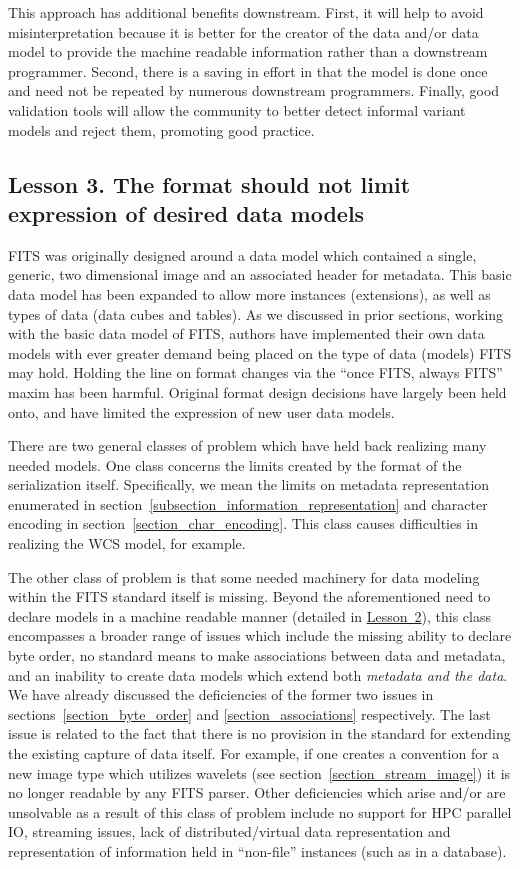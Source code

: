 \documentclass[final,authoryear,5p,times,twocolumn]{elsarticle}
\begin{document}
{{This approach has additional benefits downstream. First, it will help 
to avoid misinterpretation because it is better for the creator
of the data and/or data model to provide the machine readable information rather
than a downstream programmer. Second, there is a saving in effort
in that the model is done once and need not be repeated by numerous
downstream programmers. Finally, good validation tools will allow the community
to better detect informal variant models and reject them, promoting good
practice.


\subsection{Lesson 3. The format should not limit expression of desired data models}

FITS was originally designed around a data model which contained a single, generic, 
two dimensional image and an associated header for metadata. This basic data model
has been expanded to allow more instances (extensions), as well as types of data 
(data cubes and tables). 
As we discussed in prior sections, working with the basic data model of FITS,
authors have implemented their own data models with ever greater demand being
placed on the type of data (models) FITS may hold.
Holding the line on format changes via the ``once FITS, always FITS'' maxim 
has been harmful.  Original format design decisions have largely been held onto, 
and have limited the expression of new user data models. 


There are two general classes of problem which have held back realizing
many needed models. One class concerns the limits created by the format
of the serialization itself. Specifically, we mean the limits on metadata 
representation enumerated in section~\ref{subsection_information_representation}
and character encoding in section~\ref{section_char_encoding}.
This class causes difficulties in realizing the WCS model, for example.


The other class of problem is that some needed machinery for data modeling
within the FITS standard itself is missing. Beyond the aforementioned need to
declare models in a machine readable manner (detailed in
\hyperref[section_lesson_2]{Lesson~2}), this class encompasses a broader range
of issues which include the missing ability to declare byte order, 
no standard means to make associations between data and metadata, and 
an inability to create data models which extend both
\textit{metadata and the data}. We have already discussed the deficiencies of
the former two issues in sections~\ref{section_byte_order} and
\ref{section_associations} respectively.  The last issue is related to the fact
that there is no provision in the standard for extending the existing capture
of data itself. For example, if one creates a convention for a new image type
which utilizes wavelets (see section~\ref{section_stream_image}) it is no
longer readable by any FITS parser. Other deficiencies which arise and/or are
unsolvable as a result of this class of problem include no support for HPC
parallel IO, streaming issues, lack of distributed/virtual data representation
and representation of information held in ``non-file'' instances (such as in a
database).


}}
\end{document}
